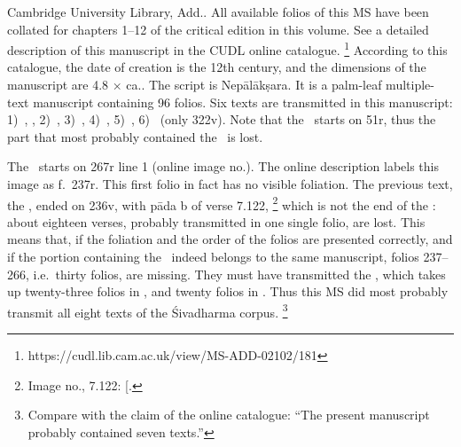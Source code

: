 Cambridge University Library, Add.. 
All available folios of this MS have been collated for 
chapters 1--12 of the critical edition in this volume. 
See a detailed description of this manuscript 
in the CUDL online catalogue.%
	\footnote{https://cudl.lib.cam.ac.uk/view/MS-ADD-02102/181}
According to this catalogue, the date of creation is the 12th
century, and the dimensions of the manuscript are 
4.8 × ca.\thinspace 52.5cm. 
The script is Nepālākṣara. It is a palm-leaf multiple-text manuscript
containing 96 folios. Six texts are transmitted in this manuscript: 
1)~, ,
2)~, 
3)~, 
4)~,
5)~,
6)~ (only \fol322v). 
Note that the \SDhU\ starts on \fol51r, thus the part that most probably contained the \SDhS\ is lost.

The \Vss\ starts on \fol267r line 1 
(online image no.). 
The online description labels this image as f.~237r. 
This first folio in fact has no visible foliation.
The previous text, the ,
ended on \fol236v, with pāda b of verse 7.122,%
 		\footnote{Image no., 
   7.122: 
  {[}\skt{prāsā}{]}.}
which is not the end of the : 
about eighteen 
verses, probably transmitted in one single folio, are lost.
This means that, if the foliation and the order of the folios
are presented correctly, and if the portion containing
the \VSS\ indeed belongs to the same manuscript, 
folios 237--266, i.e.\ thirty folios, are missing. 
They must have transmitted the 
\Uums, 
which takes up twenty-three folios in \msCa, and twenty folios in \msCb.
Thus this MS did most probably transmit all eight texts of the
Śivadharma corpus.%
	\footnote{Compare with the claim of the online catalogue:
		``The present manuscript probably contained seven texts.''}	

